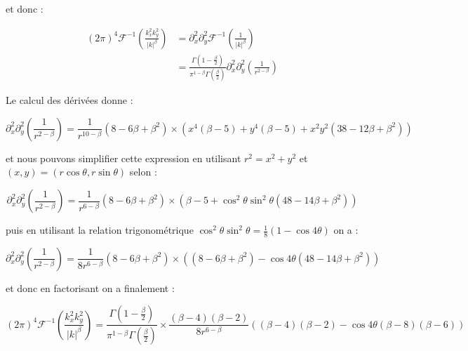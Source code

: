 \noindent et donc :

\begin{equation}
\begin{aligned}
    (2\pi)^4\mathcal{F}^{-1}\left( \frac{k_x^2k_y^2}{\lvert k \rvert^\beta} \right) &= \partial_x^2\partial_y^2\mathcal{F}^{-1}\left( \frac{1}{\lvert k \rvert^\beta} \right)\\
    &=\frac{\Gamma\left( 1-\frac{\beta}{2} \right)}{\pi^{1-\beta}\Gamma\left( \frac{\beta}{2} \right)}\partial_x^2\partial_y^2\left( \frac{1}{r^{2-\beta}} \right)
\end{aligned}
\end{equation}

\noindent Le calcul des dérivées donne :

\begin{equation}
    \partial_x^2\partial_y^2\left( \frac{1}{r^{2-\beta}} \right) = \frac{1}{r^{10-\beta}}(8-6\beta+\beta^2)\times\left(x^4(\beta-5)+y^4(\beta-5)+x^2y^2(38-12\beta+\beta^2)\right)
\end{equation}

\noindent et nous pouvons simplifier cette expression en utilisant  $r^2=x^2+y^2$ et $(x,y)=(r\cos\theta,r\sin\theta)$ selon :

\begin{equation}
    \partial_x^2\partial_y^2\left( \frac{1}{r^{2-\beta}} \right) = \frac{1}{r^{6-\beta}}(8-6\beta+\beta^2)\times\left(\beta-5+\cos^2\theta\sin^2\theta(48-14\beta+\beta^2)\right)
\end{equation}

\noindent puis en utilisant la relation trigonométrique $\cos^2\theta\sin^2\theta = \frac{1}{8}(1-\cos4\theta)$ on a :

\begin{equation}
    \partial_x^2\partial_y^2\left( \frac{1}{r^{2-\beta}} \right) = \frac{1}{8r^{6-\beta}}(8-6\beta+\beta^2)\times\left((8-6\beta+\beta^2)-\cos4\theta(48-14\beta+\beta^2)\right)
\end{equation}

\noindent et donc en factorisant on a finalement :

\begin{equation}
    (2\pi)^4\mathcal{F}^{-1}\left( \frac{k_x^2k_y^2}{\lvert k \rvert^\beta} \right) = \frac{\Gamma\left( 1-\frac{\beta}{2} \right)}{\pi^{1-\beta}\Gamma\left( \frac{\beta}{2} \right)}\times\frac{(\beta-4)(\beta-2)}{8r^{6-\beta}}\left( (\beta-4)(\beta-2)-\cos4\theta(\beta-8)(\beta-6) \right)
\end{equation}

